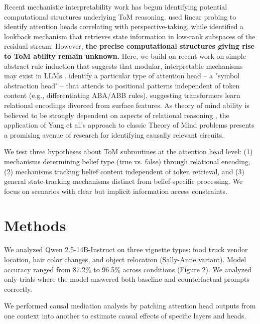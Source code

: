 \documentclass[letterpaper]{article} %
\begin{document}
Recent mechanistic interpretability work has begun identifying potential computational structures underlying ToM reasoning. \citet{liBlackBoxesTransparent2025} used linear probing to identify attention heads correlating with perspective-taking, while \citet{prakashLanguageModelsUse2025} identified a lookback mechanism that retrieves state information in low-rank subspaces of the residual stream. However, \textbf{the precise computational structures giving rise to ToM ability remain unknown.} Here, we build on recent work on simple abstract rule induction that suggests that modular, interpretable mechanisms may exist in LLMs \citet{yang_emergent_2025}.
\citeauthor{yang_emergent_2025} identify a particular type of attention head --  a "symbol abstraction head" -- that attends to positional patterns independent of token content (e.g., differentiating ABA/ABB rules), suggesting transformers learn relational encodings divorced from surface features. As theory of mind ability is believed to be strongly dependent on aspects of relational reasoning \citep{frith_neural_2006}, the application of Yang et al.'s approach to classic Theory of Mind problems presents a promising avenue of research for identifying causally relevant circuits. 

We test three hypotheses about ToM subroutines at the attention head level: (1) mechanisms determining belief type (true vs. false) through relational encoding, (2) mechanisms tracking belief content independent of token retrieval, and (3) general state-tracking mechanisms distinct from belief-specific processing. We focus on scenarios with clear but implicit information access constraints.

\section{Methods}
We analyzed Qwen 2.5-14B-Instruct on three vignette types: food truck vendor location, hair color changes, and object relocation (Sally-Anne variant). Model accuracy ranged from 87.2\% to 96.5\% across conditions (Figure 2). We analyzed only trials where the model answered both baseline and counterfactual prompts correctly.

We performed causal mediation analysis \citep{meng_locating_2023, yang_emergent_2025, wangInterpretabilityWildCircuit2022} by patching attention head outputs from one context into another to estimate causal effects of specific layers and heads.
\end{document}
